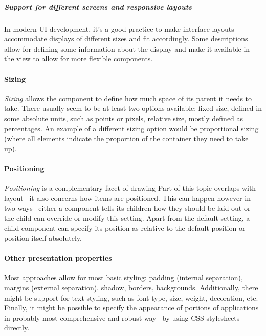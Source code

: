 \subparagraph{Support for different screens and responsive layouts}
In modern UI development, it's a good practice to make interface layouts accommodate displays of different sizes and fit accordingly.
Some descriptions allow for defining some information about the display and make it available in the view to allow for more flexible components.

\paragraph{Sizing}
\emph{Sizing} allows the component to define how much space of its parent it needs to take.
There usually seem to be at least two options available: fixed size, defined in some absolute units, such as points or pixels, relative size, mostly defined as percentages.
An example of a different sizing option would be proportional sizing (where all elements indicate the proportion of the container they need to take up).

\paragraph{Positioning}
\emph{Positioning} is a complementary facet of drawing
Part of this topic overlaps with layout \textendash\ it also concerns how items are positioned.
This can happen however in two ways \textendash\ either a component tells its children how they should be laid out or the child can override or modify this setting.
Apart from the default setting, a child component can specify its position as relative to the default position or position itself absolutely.

\paragraph{Other presentation properties}
Most approaches allow for most basic styling: padding (internal separation), margins (external separation), shadow, borders, backgrounds.
Additionally, there might be support for text styling, such as font type, size, weight, decoration, etc.
Finally, it might be possible to specify the appearance of portions of applications in probably most comprehensive and robust way \textendash\ by using CSS stylesheets directly.
